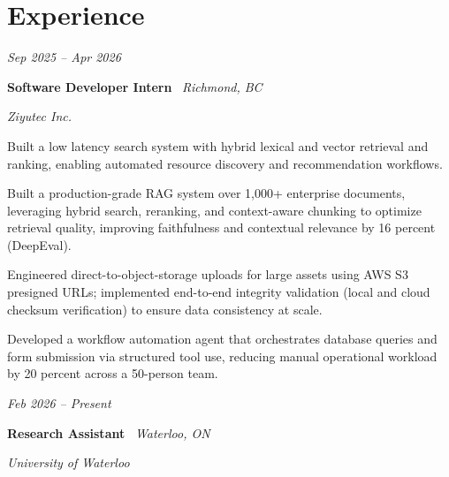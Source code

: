 \section{Experience}

    \begin{twocolentry}{

    \textit{Sep 2025 -- Apr 2026}}
        \textbf{Software Developer Intern} \textbar\ \textit{Richmond, BC}
        
        \textit{Ziyutec Inc.}
    \end{twocolentry}

    \vspace{0.10 cm}
    \begin{onecolentry}
        \begin{highlights}
    
    \item Built a low latency search system with hybrid lexical and vector retrieval and ranking, enabling automated resource discovery and recommendation workflows.
    \item Built a production-grade RAG system over 1,000+ enterprise documents, leveraging hybrid search, reranking, and context-aware chunking to optimize retrieval quality, improving faithfulness and contextual relevance by 16 percent (DeepEval).
    \item Engineered direct-to-object-storage uploads for large assets using AWS S3 presigned URLs; implemented end-to-end integrity validation  (local and cloud checksum verification) to ensure data consistency at scale.
    \item Developed a workflow automation agent that orchestrates database queries and form submission via structured tool use, reducing manual operational workload by 20 percent across a 50-person team.
        
        \end{highlights}
    \end{onecolentry}
\vspace{0.2cm}    \begin{twocolentry}{

    \textit{Feb 2026 -- Present}}
        \textbf{Research Assistant} \textbar\ \textit{Waterloo, ON}
        
        \textit{University of Waterloo}
    \end{twocolentry}

